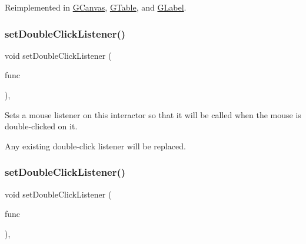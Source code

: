 Reimplemented in \mbox{\hyperlink{classGCanvas_a56845b1accc47aa881d05939eef6996c}{G\+Canvas}}, \mbox{\hyperlink{classGTable_a56845b1accc47aa881d05939eef6996c}{G\+Table}}, and \mbox{\hyperlink{classGLabel_a56845b1accc47aa881d05939eef6996c}{G\+Label}}.

\mbox{\label{classGInteractor_ac29f9a3462458e165fae3a1f046ee77a}} 
\subsubsection{\texorpdfstring{set\+Double\+Click\+Listener()}{setDoubleClickListener()}\hspace{0.1cm}{\footnotesize\ttfamily [1/2]}}
{\footnotesize\ttfamily void set\+Double\+Click\+Listener (\begin{DoxyParamCaption}\item[{G\+Event\+Listener}]{func }\end{DoxyParamCaption})\hspace{0.3cm}{\ttfamily [virtual]}, {\ttfamily [inherited]}}



Sets a mouse listener on this interactor so that it will be called when the mouse is double-\/clicked on it. 

Any existing double-\/click listener will be replaced. \mbox{\label{classGInteractor_a50096194d66f48c92dd4c512d41bfc76}} 
\subsubsection{\texorpdfstring{set\+Double\+Click\+Listener()}{setDoubleClickListener()}\hspace{0.1cm}{\footnotesize\ttfamily [2/2]}}
{\footnotesize\ttfamily void set\+Double\+Click\+Listener (\begin{DoxyParamCaption}\item[{G\+Event\+Listener\+Void}]{func }\end{DoxyParamCaption})\hspace{0.3cm}{\ttfamily [virtual]}, {\ttfamily [inherited]}}



